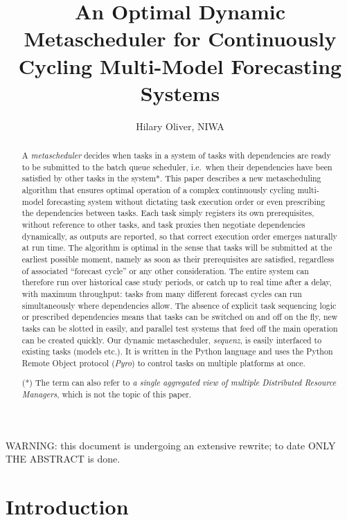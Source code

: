 \documentclass[11pt,a4paper]{article}
\title{An Optimal Dynamic Metascheduler for Continuously Cycling
Multi-Model Forecasting Systems}
\author{Hilary Oliver, NIWA}
\begin{document}
\maketitle
\tableofcontents

{\huge WARNING: this document is undergoing an extensive rewrite; to
date ONLY THE ABSTRACT is done.}

\begin{abstract}

A {\it metascheduler} decides when tasks in a system of tasks with
dependencies are ready to be submitted to the batch queue scheduler,
i.e.\ when their dependencies have been satisfied by other tasks in the
system*. This paper describes a new metascheduling algorithm that
ensures optimal operation of a complex continuously cycling multi-model
forecasting system without dictating task execution order or even
prescribing the dependencies between tasks. Each task simply registers
its own prerequisites, without reference to other tasks, and task
proxies then negotiate dependencies dynamically, as outputs are
reported, so that correct execution order emerges naturally at run time.
The algorithm is optimal in the sense that tasks will be submitted at
the earliest possible moment, namely as soon as their prerequisites are
satisfied, regardless of associated ``forecast cycle'' or any other
consideration.  The entire system can therefore run over historical case
study periods, or catch up to real time after a delay, with maximum
throughput: tasks from many different forecast cycles can run
simultaneously where dependencies allow. The absence of explicit task
sequencing logic or prescribed dependencies means that tasks can be
switched on and off on the fly, new tasks can be slotted in easily, and
parallel test systems that feed off the main operation can be created
quickly. Our dynamic metascheduler, {\em sequenz}, is easily interfaced
to existing tasks (models etc.). It is written in the Python language
and uses the Python Remote Object protocol ({\em Pyro}) to control tasks
on multiple platforms at once. 

(*) The term can also refer to {\it a single aggregated view of multiple
Distributed Resource Managers}, which is not the topic of this paper.

\end{abstract}

\section{Introduction}
\end{document}
